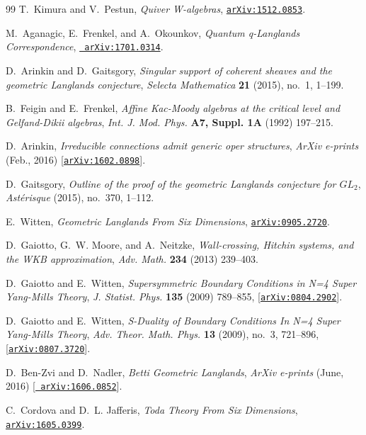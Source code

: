 \begin{thebibliography}{99}
T.~Kimura and V.~Pestun, {\it {Quiver W-algebras}},
  \href{http://xxx.lanl.gov/abs/1512.0853}{{\tt arXiv:1512.0853}}.

M.~Aganagic, E.~Frenkel, and A.~Okounkov, {\it {Quantum q-Langlands
  Correspondence}},  \href{http://xxx.lanl.gov/abs/1701.0314}{{\tt
  arXiv:1701.0314}}.

D.~Arinkin and D.~Gaitsgory, {\it Singular support of coherent sheaves and the
  geometric Langlands conjecture},  {\em Selecta Mathematica} {\bf 21} (2015),
  no.~1, 1--199.

B.~Feigin and E.~Frenkel, {\it {Affine Kac-Moody algebras at the critical level
  and Gelfand-Dikii algebras}},  {\em Int. J. Mod. Phys.} {\bf A7, \rm Suppl.
  1A} (1992) 197--215.

D.~{Arinkin}, {\it {Irreducible connections admit generic oper structures}},
  {\em ArXiv e-prints} (Feb., 2016)
  [\href{http://xxx.lanl.gov/abs/1602.0898}{{\tt arXiv:1602.0898}}].

D.~Gaitsgory, {\it Outline of the proof of the geometric {L}anglands conjecture
  for {$GL_2$}},  {\em Ast\'erisque} (2015), no.~370, 1--112.

E.~Witten, {\it {Geometric Langlands From Six Dimensions}},
  \href{http://xxx.lanl.gov/abs/0905.2720}{{\tt arXiv:0905.2720}}.

D.~Gaiotto, G.~W. Moore, and A.~Neitzke, {\it Wall-crossing, {H}itchin systems,
  and the {WKB} approximation},  {\em Adv. Math.} {\bf 234} (2013) 239--403.

D.~Gaiotto and E.~Witten, {\it {Supersymmetric Boundary Conditions in N=4 Super
  Yang-Mills Theory}},  {\em J. Statist. Phys.} {\bf 135} (2009) 789--855,
  [\href{http://xxx.lanl.gov/abs/0804.2902}{{\tt arXiv:0804.2902}}].

D.~Gaiotto and E.~Witten, {\it {S-Duality of Boundary Conditions In N=4 Super
  Yang-Mills Theory}},  {\em Adv. Theor. Math. Phys.} {\bf 13} (2009), no.~3,
  721--896, [\href{http://xxx.lanl.gov/abs/0807.3720}{{\tt arXiv:0807.3720}}].

D.~{Ben-Zvi} and D.~{Nadler}, {\it {Betti Geometric Langlands}},  {\em ArXiv
  e-prints} (June, 2016) [\href{http://xxx.lanl.gov/abs/1606.0852}{{\tt
  arXiv:1606.0852}}].

C.~Cordova and D.~L. Jafferis, {\it {Toda Theory From Six Dimensions}},
  \href{http://xxx.lanl.gov/abs/1605.0399}{{\tt arXiv:1605.0399}}.


\end{thebibliography}

